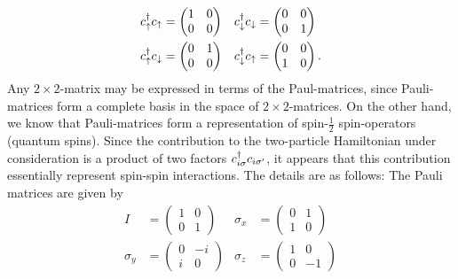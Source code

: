 \begin{align*}
	c^{\dagger}_{\uparrow}c_{\uparrow} &= \begin{pmatrix}
		1 & 0\\0&0
	\end{pmatrix} &
	c^{\dagger}_{\downarrow}c_{\downarrow} &= \begin{pmatrix}
	0 & 0\\0&1
\end{pmatrix} \\
c^{\dagger}_{\uparrow}c_{\downarrow} &= \begin{pmatrix}
	0 & 1\\0&0
\end{pmatrix} &
c^{\dagger}_{\downarrow}c_{\uparrow} &= \begin{pmatrix}
	0 & 0\\1&0
\end{pmatrix}.
\end{align*}
Any $2\times2$-matrix may be expressed in terms of the Paul-matrices, since Pauli-matrices form a complete basis in the space of $2\times2$-matrices.
On the other hand, we know that Pauli-matrices form a representation of spin-$\frac12$ spin-operators (quantum spins). 
Since the contribution to the two-particle Hamiltonian under consideration is a product of two factors $c^{\dagger}_{i\sigma}c_{i\sigma'}$, it appears that this contribution essentially represent spin-spin interactions. 
The details are as follows: 
The Pauli matrices are given by
\begin{align}
	I &= \begin{pmatrix}
		1 &0\\0&1
	\end{pmatrix}  & 	
	\sigma_x &= \begin{pmatrix}
		0& 1\\1&0
	\end{pmatrix} \\
\sigma_y &= \begin{pmatrix}
	0&-i \\ i & 0
\end{pmatrix} & \sigma_z &= \begin{pmatrix}
1&0 \\0&-1
\end{pmatrix}
\end{align}

